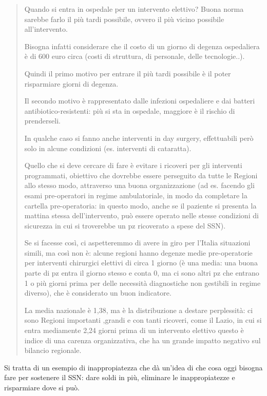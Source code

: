\documentclass[]{article}
\begin{document}
\begin{quote}
Quando si entra in ospedale per un intervento elettivo? Buona norma
sarebbe farlo il più tardi possibile, ovvero il più vicino possibile
all'intervento.

Bisogna infatti considerare che il costo di un giorno di degenza
ospedaliera è di 600 euro circa (costi di struttura, di personale, delle
tecnologie..).

Quindi il primo motivo per entrare il più tardi possibile è il poter
risparmiare giorni di degenza.

Il secondo motivo è rappresentato dalle infezioni ospedaliere e dai
batteri antibiotico-resistenti: più si sta in ospedale, maggiore è il
rischio di prenderseli.

In qualche caso si fanno anche interventi in day surgery, effettuabili
però solo in alcune condizioni (es. interventi di cataratta).

Quello che si deve cercare di fare è evitare i ricoveri per gli
interventi programmati, obiettivo che dovrebbe essere perseguito da
tutte le Regioni allo stesso modo, attraverso una buona organizzazione
(ad es. facendo gli esami pre-operatori in regime ambulatoriale, in modo
da completare la cartella pre-operatoria: in questo modo, anche se il
paziente si presenta la mattina stessa dell'intervento, può essere
operato nelle stesse condizioni di sicurezza in cui si troverebbe un pz
ricoverato a spese del SSN).

Se si facesse così, ci aspetteremmo di avere in giro per l'Italia
situazioni simili, ma così non è: alcune regioni hanno degenze medie
pre-operatorie per interventi chirurgici elettivi di circa 1 giorno (è
una media: una buona parte di pz entra il giorno stesso e conta 0, ma ci
sono altri pz che entrano 1 o più giorni prima per delle necessità
diagnostiche non gestibili in regime diverso), che è considerato un buon
indicatore.

La media nazionale è 1,38, ma è la distribuzione a destare perplessità:
ci sono Regioni importanti ,grandi e con tanti ricoveri, come il Lazio,
in cui si entra mediamente 2,24 giorni prima di un intervento elettivo
questo è indice di una carenza organizzativa, che ha un grande impatto
negativo sul bilancio regionale.
\end{quote}

Si tratta di un esempio di inappropiatezza che dà un'idea di che cosa
oggi bisogna fare per sostenere il SSN: dare soldi in più, eliminare le
inappropiatezze e risparmiare dove si può.
\end{document}
